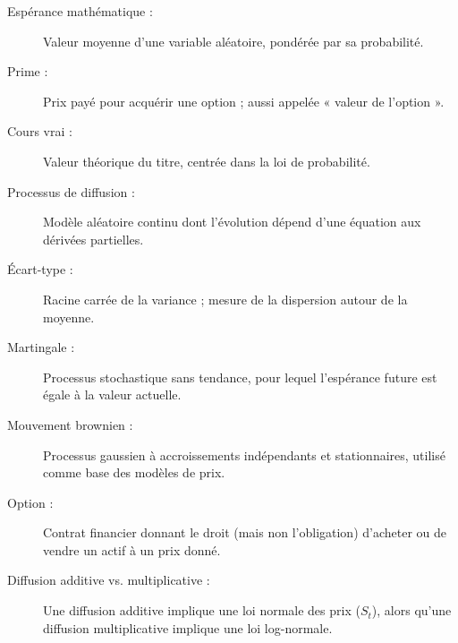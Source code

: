 \documentclass[12pt,a4paper]{article}
\begin{document}
\begin{description}
    \item[Espérance mathématique :] Valeur moyenne d’une variable aléatoire, pondérée par sa probabilité.
    \item[Prime :] Prix payé pour acquérir une option ; aussi appelée « valeur de l’option ».
    \item[Cours vrai :] Valeur théorique du titre, centrée dans la loi de probabilité.
    \item[Processus de diffusion :] Modèle aléatoire continu dont l’évolution dépend d’une équation aux dérivées partielles.
    \item[Écart-type :] Racine carrée de la variance ; mesure de la dispersion autour de la moyenne.
    \item[Martingale :] Processus stochastique sans tendance, pour lequel l’espérance future est égale à la valeur actuelle.
    \item[Mouvement brownien :] Processus gaussien à accroissements indépendants et stationnaires, utilisé comme base des modèles de prix.
    \item[Option :] Contrat financier donnant le droit (mais non l’obligation) d’acheter ou de vendre un actif à un prix donné.
    \item[Diffusion additive vs. multiplicative :] Une diffusion additive implique une loi normale des prix ($S_t$), alors qu’une diffusion multiplicative implique une loi log-normale.
\end{description}
\end{document}

